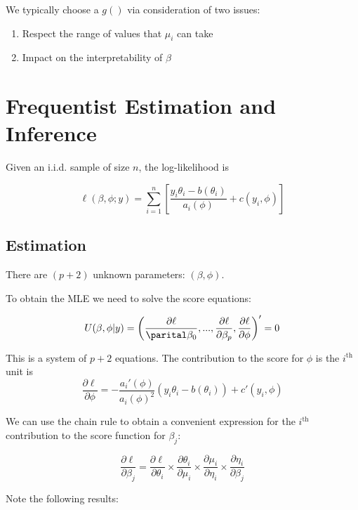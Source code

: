 \documentclass[
  letterpaper,
  DIV=11,
  numbers=noendperiod]{scrreport}
\providecommand{\tightlist}{%
  \setlength{\itemsep}{0pt}\setlength{\parskip}{0pt}}\usepackage{longtable,booktabs,array}
\begin{document}
We typically choose a \(g()\) via consideration of two issues:

\begin{enumerate}
\def\labelenumi{\arabic{enumi}.}
\tightlist
\item
  Respect the range of values that \(\mu_i\) can take
\item
  Impact on the interpretability of \(\beta\)
\end{enumerate}


\hypertarget{frequentist-estimation-and-inference}{%
\chapter{Frequentist Estimation and
Inference}\label{frequentist-estimation-and-inference}}

Given an i.i.d. sample of size \(n\), the log-likelihood is

\[\ell(\beta, \phi; y) = \sum_{i=1}^n \left[ \frac{y_i \theta_i - b(\theta_i)}{a_i(\phi)} + c(y_i, \phi)\right]\]

\hypertarget{estimation-1}{%
\section{Estimation}\label{estimation-1}}

There are \((p+2)\) unknown parameters: \((\beta, \phi)\).

To obtain the MLE we need to solve the score equations:

\[U(\beta, \phi | y) = \left( \frac{\partial \ell}{\parital \beta_0}, ..., \frac{\partial \ell}{\partial \beta_p}, \frac{\partial \ell}{\partial \phi} \right)' = 0\]

This is a system of \(p+2\) equations. The contribution to the score for
\(\phi\) is the \(i^{\mathrm{th}}\) unit is
\[\frac{\partial \ell}{\partial \phi} = - \frac{a_i'(\phi)}{a_i(\phi)^2}(y_i \theta_i - b(\theta_i)) + c'(y_i, \phi)\]

We can use the chain rule to obtain a convenient expression for the
\(i^{\mathrm{th}}\) contribution to the score function for \(\beta_j\):

\[\frac{\partial \ell}{\partial \beta_j} = \frac{\partial \ell}{\partial \theta_i} \times \frac{\partial \theta_i}{\partial \mu_i} \times \frac{\partial \mu_i}{\partial \eta_i} \times \frac{\partial \eta_i}{\partial \beta_j}\]

Note the following results:
\end{document}
